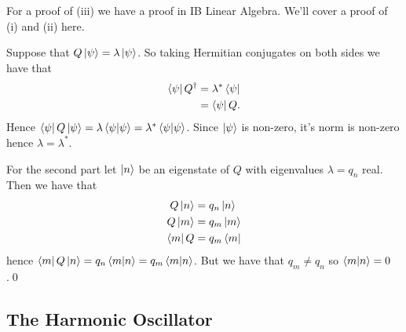 \documentclass{article}
\begin{document}
  For a proof of (iii) we have a proof in IB Linear Algebra. We'll cover a proof of (i) and (ii) here.\par
  \pf Suppose that $ Q\ket \psi = \lambda\ket \psi $. So taking Hermitian conjugates on both sides we have that 
  \begin{align*}
	  \bra \psi Q^\dagger &= \lambda^*\bra \psi \\
			      &= \bra \psi Q.
  \end{align*}
  Hence $ \bra \psi Q \ket \psi = \lambda \bra{\psi}\ket{\psi} = \lambda^* \bra{\psi}\ket{\psi} $. Since $ \ket \psi $ is non-zero, it's norm is non-zero hence $ \lambda = \lambda^* $.

\par
For the second part let $ \ket n $ be an eigenstate of $ Q $ with eigenvalues $ \lambda = q_n $ real. Then we have that
\begin{align*}
	Q \ket n &= q_n\ket n \\
	Q\ket m &= q_m\ket m \\
	\bra m Q&= q_m\bra m
\end{align*}
hence $ \bra m Q \ket n = q_n\bra{m}\ket{n} = q_m\bra{m}\ket{n} $. But we have that $ q_m\ne q_n $ so $ \bra{m}\ket{n} = 0 $.\qed
\subsection{The Harmonic Oscillator}
\end{document}
